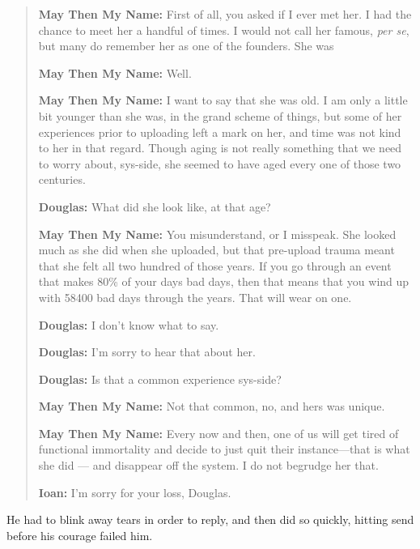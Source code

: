 \begin{quote}
\textbf{May Then My Name:} First of all, you asked if I ever met her. I had the chance to meet her a handful of times. I would not call her famous, \emph{per se}, but many do remember her as one of the founders. She was

\textbf{May Then My Name:} Well.

\textbf{May Then My Name:} I want to say that she was old. I am only a little bit younger than she was, in the grand scheme of things, but some of her experiences prior to uploading left a mark on her, and time was not kind to her in that regard. Though aging is not really something that we need to worry about, sys-side, she seemed to have aged every one of those two centuries.

\textbf{Douglas:} What did she look like, at that age?

\textbf{May Then My Name:} You misunderstand, or I misspeak. She looked much as she did when she uploaded, but that pre-upload trauma meant that she felt all two hundred of those years. If you go through an event that makes 80\% of your days bad days, then that means that you wind up with 58400 bad days through the years. That will wear on one.

\textbf{Douglas:} I don't know what to say.

\textbf{Douglas:} I'm sorry to hear that about her.

\textbf{Douglas:} Is that a common experience sys-side?

\textbf{May Then My Name:} Not that common, no, and hers was unique.

\textbf{May Then My Name:} Every now and then, one of us will get tired of functional immortality and decide to just quit their instance---that is what she did — and disappear off the system. I do not begrudge her that.

\textbf{Ioan:} I'm sorry for your loss, Douglas.
\end{quote}

\noindent He had to blink away tears in order to reply, and then did so quickly, hitting send before his courage failed him.

